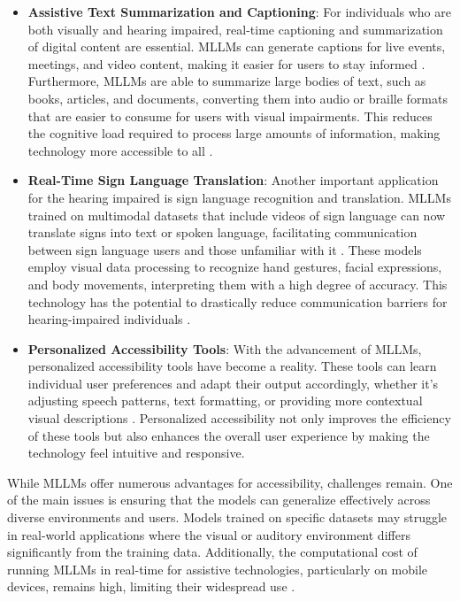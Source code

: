 \documentclass{article}
\begin{document}
\begin{itemize}
    \item \textbf{Assistive Text Summarization and Captioning}: For individuals who are both visually and hearing impaired, real-time captioning and summarization of digital content are essential. MLLMs can generate captions for live events, meetings, and video content, making it easier for users to stay informed \cite{vs2020ramesh}. Furthermore, MLLMs are able to summarize large bodies of text, such as books, articles, and documents, converting them into audio or braille formats that are easier to consume for users with visual impairments. This reduces the cognitive load required to process large amounts of information, making technology more accessible to all \cite{vs2023gomez}.

    \item \textbf{Real-Time Sign Language Translation}: Another important application for the hearing impaired is sign language recognition and translation. MLLMs trained on multimodal datasets that include videos of sign language can now translate signs into text or spoken language, facilitating communication between sign language users and those unfamiliar with it \cite{vs2024wang}. These models employ visual data processing to recognize hand gestures, facial expressions, and body movements, interpreting them with a high degree of accuracy. This technology has the potential to drastically reduce communication barriers for hearing-impaired individuals \cite{vs2024huang}.

    \item \textbf{Personalized Accessibility Tools}: With the advancement of MLLMs, personalized accessibility tools have become a reality. These tools can learn individual user preferences and adapt their output accordingly, whether it's adjusting speech patterns, text formatting, or providing more contextual visual descriptions \cite{vs2024song}. Personalized accessibility not only improves the efficiency of these tools but also enhances the overall user experience by making the technology feel intuitive and responsive.

\end{itemize}

While MLLMs offer numerous advantages for accessibility, challenges remain. One of the main issues is ensuring that the models can generalize effectively across diverse environments and users. Models trained on specific datasets may struggle in real-world applications where the visual or auditory environment differs significantly from the training data. Additionally, the computational cost of running MLLMs in real-time for assistive technologies, particularly on mobile devices, remains high, limiting their widespread use \cite{vs2023huang}.
\end{document}
